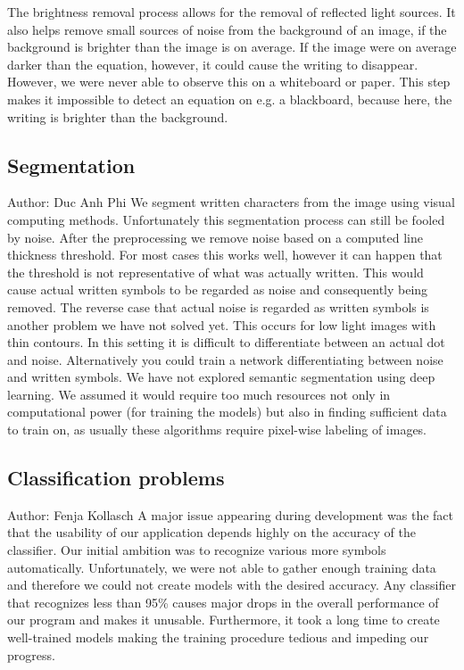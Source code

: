 \documentclass[11pt]{article}
\begin{document}
	The brightness removal process allows for the removal of reflected light sources.
	It also helps remove small sources of noise from the background of an image, if the background is brighter than the image is on average.
	If the image were on average darker than the equation, however, it could cause the writing to disappear.
	However, we were never able to observe this on a whiteboard or paper.
	This step makes it impossible to detect an equation on e.g. a blackboard, because here, the writing is brighter than the background.
	
	\subsection{Segmentation}
	\small{Author: Duc Anh Phi} \newline \newline
	We segment written characters from the image using visual computing methods. Unfortunately this segmentation process can still be fooled by noise. After the preprocessing we remove noise based on a computed line thickness threshold. For most cases this works well, however it can happen that the threshold is not representative of what was actually written. This would cause actual written symbols to be regarded as noise and consequently being removed. The reverse case that actual noise is regarded as written symbols is another problem we have not solved yet. This occurs for low light images with thin contours. In this setting it is difficult to differentiate between an actual dot and noise. Alternatively you could train a network differentiating between noise and written symbols. We have not explored semantic segmentation using deep learning. We assumed it would require too much resources not only in computational power (for training the models) but also in finding sufficient data to train on, as usually these algorithms require pixel-wise labeling of images.
	
	\subsection{Classification problems}
	\small{Author: Fenja Kollasch} \newline \newline
	A major issue appearing during development was the fact that the usability of our application depends highly on the accuracy of the classifier. Our initial ambition was to recognize various more symbols automatically. Unfortunately, we were not able to gather enough training data and therefore we could not create models with the desired accuracy. Any classifier that recognizes less than 95\% causes major drops in the overall performance of our program and makes it unusable. Furthermore, it took a long time to create well-trained models making the training procedure tedious and impeding our progress.
\end{document}
